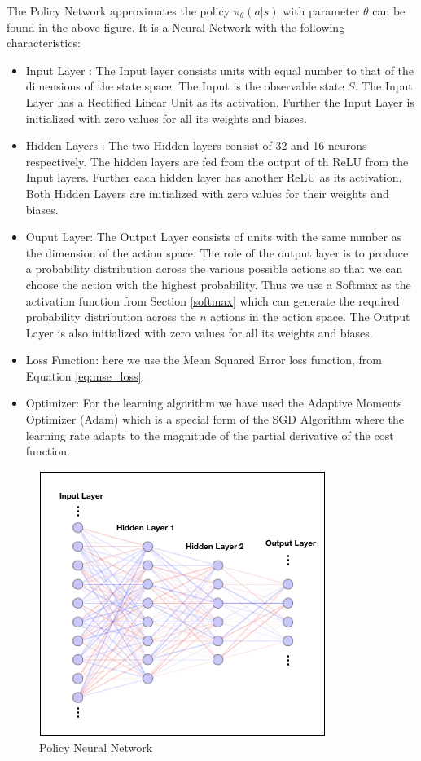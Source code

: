 \documentclass[14pt]{extarticle}
\numberwithin{equation}{section}
\begin{document}
	The Policy Network approximates the policy $\pi_{\theta}(a| s)$ with parameter $\theta$ can be found in the above figure. It is a Neural Network with the following characteristics:
	\begin{itemize}
		\item Input Layer : The Input layer consists units with equal number to that of the dimensions of the state space. The Input is the observable state $S$. The Input Layer has a Rectified Linear Unit as its activation. Further the Input Layer is initialized with zero values for all its weights and biases. 
		\item Hidden Layers : The two Hidden layers consist of 32 and 16 neurons respectively. The hidden layers are fed from the output of th ReLU from the Input layers. Further each hidden layer has another ReLU as its activation. Both Hidden Layers are initialized with zero values for their weights and biases.
		\item Ouput Layer: The Output Layer consists of units with the same number as the dimension of the action space. The role of the output layer is to produce a probability distribution across the various possible actions so that we can choose the action with the highest probability. Thus we use a Softmax as the activation function from Section \ref{softmax} which can generate the required probability distribution across the $n$ actions in the action space. The Output Layer is also initialized with zero values for all its weights and biases.
		\item Loss Function: here we use the Mean Squared Error loss function, from Equation \eqref{eq:mse_loss}.
		\item Optimizer: For the learning algorithm we have used the Adaptive Moments Optimizer (Adam)\cite{kingma2014adam} which is a special form of the SGD Algorithm where the learning rate adapts to the magnitude of the partial derivative of the cost function. 
	\end{itemize}
		\begin{figure}[h]
		\vspace{0.2cm}
		\centering
		\includegraphics[scale=0.6]{nn-actor}
		\caption{Policy Neural Network
			\label{nn-policy}}
	\end{figure}
\end{document}
